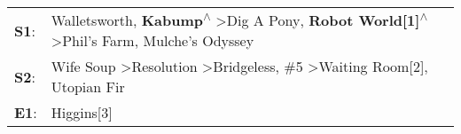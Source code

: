 \begin{supertabular}{p{0.03\textwidth}p{0.92\textwidth}}
 \textbf{S1}:  &  Walletsworth\textsuperscript{}, \enspace \textbf{Kabump\textsuperscript{$\wedge$}} \textgreater \enspace Dig A Pony\textsuperscript{}, \enspace \textbf{Robot World[1]\textsuperscript{$\wedge$}} \textgreater \enspace Phil's Farm\textsuperscript{}, \enspace Mulche's Odyssey\textsuperscript{}  \enspace  \\
 \textbf{S2}:  &                                   Wife Soup\textsuperscript{} \textgreater \enspace Resolution\textsuperscript{} \textgreater \enspace Bridgeless\textsuperscript{}, \enspace \#5\textsuperscript{} \textgreater \enspace Waiting Room[2]\textsuperscript{}, \enspace Utopian Fir\textsuperscript{}  \enspace  \\
 \textbf{E1}:  &                                                                                                                                                                                                                                                                        Higgins[3]\textsuperscript{}  \enspace  \\
\end{supertabular}
